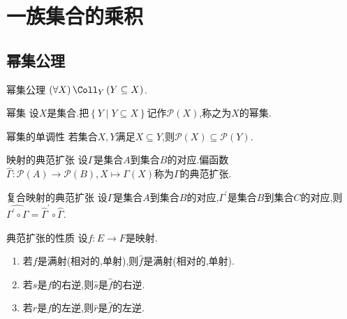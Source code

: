 \chapter{一族集合的乘积}

\section{幂集公理}

\begin{axiom}{幂集公理}{}
	$\left(\forall X\right)\Coll_{Y}\left(Y\subseteq X\right)$.
\end{axiom}

\begin{definition}{幂集}{}
	设$X$是集合.把$\left\{Y\middle|Y\subseteq X\right\}$记作$\mathcal{P}\left(X\right)$,称之为$X$的幂集.
\end{definition}

\begin{proposition}{幂集的单调性}{}
	若集合$X,Y$满足$X\subseteq Y$,则$\mathcal{P}\left(X\right)\subseteq\mathcal{P}\left(Y\right)$.
\end{proposition}

\begin{definition}{映射的典范扩张}{}
	设$\Gamma$是集合$A$到集合$B$的对应.偏函数$\hat{\Gamma}:\mathcal{P}\left(A\right)\to\mathcal{P}\left(B\right),X\mapsto\Gamma\left(X\right)$称为$\Gamma$的典范扩张.
\end{definition}

\begin{proposition}{复合映射的典范扩张}{}
	设$\Gamma$是集合$A$到集合$B$的对应,$\Gamma^{\prime}$是集合$B$到集合$C$的对应,则$\widehat{\Gamma^{\prime}\circ\Gamma}=\hat{\Gamma}^{\prime}\circ\hat{\Gamma}$.
\end{proposition}

\begin{proposition}{典范扩张的性质}{}
	设$f:E\to F$是映射.
	\begin{enumerate}
		\item 若$f$是满射(相对的,单射),则$\hat{f}$是满射(相对的,单射).
		\item 若$s$是$f$的右逆,则$\hat{s}$是$\hat{f}$的右逆.
		\item 若$r$是$f$的左逆,则$\hat{r}$是$\hat{f}$的左逆.
	\end{enumerate}
\end{proposition}


































